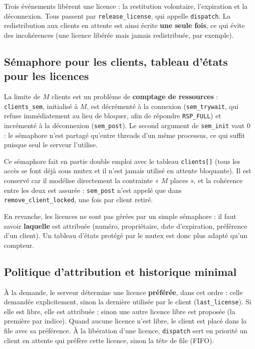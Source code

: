 \documentclass[11pt,a4paper]{article}
\newcommand{\code}[1]{\texttt{#1}}
\begin{document}
Trois événements libèrent une licence : la restitution volontaire, l'expiration et la déconnexion. Tous passent par \code{release\_license}, qui appelle \code{dispatch}. La redistribution aux clients en attente est ainsi écrite \textbf{une seule fois}, ce qui évite des incohérences (une licence libérée mais jamais redistribuée, par exemple).

\subsection{Sémaphore pour les clients, tableau d'états pour les licences}

La limite de $M$ clients est un problème de \textbf{comptage de ressources} : \code{clients\_sem}, initialisé à $M$, est décrémenté à la connexion (\code{sem\_trywait}, qui refuse immédiatement au lieu de bloquer, afin de répondre \code{RSP\_FULL}) et incrémenté à la déconnexion (\code{sem\_post}). Le second argument de \code{sem\_init} vaut 0 : le sémaphore n'est partagé qu'entre threads d'un même processus, ce qui suffit puisque seul le serveur l'utilise.

Ce sémaphore fait en partie double emploi avec le tableau \code{clients[]} (tous les accès se font déjà sous mutex et il n'est jamais utilisé en attente bloquante). Il est conservé car il modélise directement la contrainte « $M$ places », et la cohérence entre les deux est assurée : \code{sem\_post} n'est appelé que dans \code{remove\_client\_locked}, une fois par client retiré.

En revanche, les licences ne sont pas gérées par un simple sémaphore : il faut savoir \textbf{laquelle} est attribuée (numéro, propriétaire, date d'expiration, préférence d'un client). Un tableau d'états protégé par le mutex est donc plus adapté qu'un compteur.

\subsection{Politique d'attribution et historique minimal}

À la demande, le serveur détermine une licence \textbf{préférée}, dans cet ordre : celle demandée explicitement, sinon la dernière utilisée par le client (\code{last\_license}). Si elle est libre, elle est attribuée ; sinon une autre licence libre est proposée (la première par indice). Quand aucune licence n'est libre, le client est placé dans la file avec sa préférence. À la libération d'une licence, \code{dispatch} sert en priorité un client en attente qui préfère cette licence, sinon la tête de file (FIFO).
\end{document}
